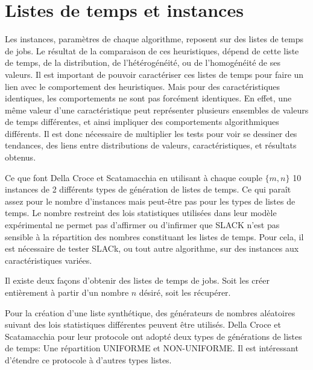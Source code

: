 \documentclass[a4paper,12pt]{report}
\theoremstyle{plain}				%
\theoremstyle{definition}				%
\newcommand\dcs{Della Croce et Scatamacchia\xspace}
\newcommand{\lp}[1]{\todo[author=LP,color=yellow,inline]{#1}}
\begin{document}
\section{Listes de temps et instances} \label{sec:listeTempsInstances}
Les instances, paramètres de chaque algorithme, reposent sur des listes de temps de jobs.
Le résultat de la comparaison de ces heuristiques, dépend de cette liste de temps, de la distribution, 
  de l'hétérogénéité, ou de l'homogénéité de ses valeurs. 
Il est important de pouvoir caractériser ces listes de temps pour faire un lien avec le comportement 
  des heuristiques. 
Mais pour des caractéristiques identiques, les comportements ne sont pas forcément identiques. 
En effet, une même valeur d'une caractéristique peut représenter plusieurs ensembles de 
  valeurs de temps différentes, et ainsi impliquer des comportements algorithmiques différents. 
Il est donc nécessaire de multiplier les tests pour voir se dessiner des tendances, 
  des liens entre distributions de valeurs, caractéristiques, et résultats obtenus.

Ce que font \dcs en utilisant à chaque couple $\{m,n\}$ 10 instances de 2 différents types de 
  génération de listes de temps. \lp{Pas de verbe dans cette phrase}
Ce qui paraît assez pour le nombre d'instances mais peut-être pas pour les types de listes de temps. 
Le nombre restreint des lois statistiques utilisées dans leur modèle expérimental ne permet pas 
  d'affirmer ou d'infirmer que SLACK n'est pas sensible à la répartition des nombres constituant 
  les listes de temps. 
Pour cela, il est nécessaire de tester SLACk, ou tout autre algorithme, sur des instances aux caractéristiques variées.


Il existe deux façons d'obtenir des listes de temps de jobs. 
Soit les créer entièrement à partir d'un nombre $n$ désiré, soit les récupérer.

Pour la création d'une liste synthétique, des générateurs de nombres aléatoires suivant des lois statistiques différentes peuvent être utilisés.  
\dcs pour leur protocole ont adopté deux types de générations de listes de temps: 
  Une répartition UNIFORME et NON-UNIFORME.
Il est intéressant d'étendre ce protocole à d'autres types listes.
\end{document}
